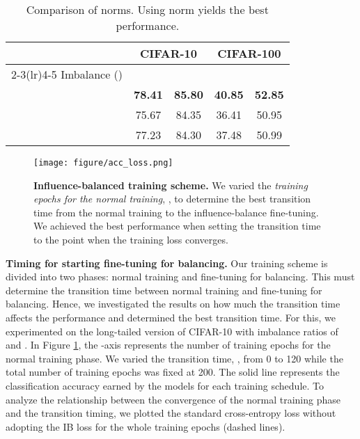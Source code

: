 \begin{table}[h]
\caption{Comparison of norms. Using  norm yields the best performance.}
\small
\centering
\begin{tabular}{ccccc}
\toprule
\multirow{2}{*}{} & \multicolumn{2}{c}{\textbf{CIFAR-10}} & \multicolumn{2}{c}{\textbf{CIFAR-100}} \\ \cmidrule(lr){2-3}\cmidrule(lr){4-5}
Imbalance ()            &           &          &           &      \\ \midrule\midrule
             & \textbf{78.41} & \textbf{85.80}& \textbf{40.85} & \textbf{52.85}         \\ 
             & 75.67          & 84.35        & 36.41          & 50.95         \\ 
        & 77.23          & 84.30         & 37.48          & 50.99         \\ 
\bottomrule
\end{tabular}
\label{ref:table_norms}
\vspace{-2mm}
\end{table}



\begin{figure}[h]
\vspace{-0.2cm}
\begin{center}
\texttt{[image: figure/acc\_loss.png]}
\caption{\textbf{Influence-balanced training scheme.}
We varied the \textit{training epochs for the normal training}, , to determine the best transition time from the normal training to the influence-balance fine-tuning. 
We achieved the best performance 
when setting the transition time to the point when the training loss converges.
}
\label{fig:training_epochs}
\end{center}
\end{figure}


\textbf{Timing for starting fine-tuning for balancing.}
Our training scheme is divided into two phases: normal training and fine-tuning for balancing. 
This must determine the transition time between normal training and fine-tuning for balancing. 
Hence, we investigated the results on how much the transition time affects the performance and determined the best transition time.
For this, we experimented on the long-tailed version of  CIFAR-10 with imbalance ratios of  and .
In Figure \ref{fig:training_epochs}, the -axis represents the number of training epochs  for the normal training phase.
We varied the transition time, , from 0 to 120 while the total number of training epochs was fixed at 200. 
The solid line represents the classification accuracy earned by the models for each training schedule.
To analyze the relationship between the convergence of the normal training phase and the transition timing, we plotted the standard cross-entropy loss without adopting the IB loss for the whole training epochs (dashed lines).


